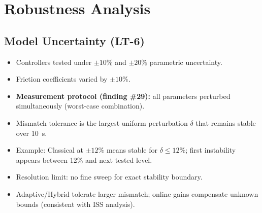 \documentclass[10pt, a4paper]{article}
\begin{document}
\section{Robustness Analysis}

\subsection{Model Uncertainty (LT-6)}

\begin{itemize}[leftmargin=1.5em,itemsep=0.2em]
  \item Controllers tested under $\pm10\%$ and $\pm20\%$ parametric uncertainty.
  \item Friction coefficients varied by $\pm10\%$.
  \item \textbf{Measurement protocol (finding \#29):}
  all parameters perturbed simultaneously (worst-case combination).
  \item Mismatch tolerance is the largest uniform perturbation $\delta$
  that remains stable over 10~s.
  \item Example: Classical at $\pm12\%$ means stable for $\delta\le12\%$;
  first instability appears between 12\% and next tested level.
  \item Resolution limit: no fine sweep for exact stability boundary.
\end{itemize}

\begin{center}
\end{center}

\begin{itemize}[leftmargin=1.5em,itemsep=0.2em]
  \item Adaptive/Hybrid tolerate larger mismatch; online gains compensate unknown bounds
  (consistent with ISS analysis).
\end{itemize}
\end{document}

